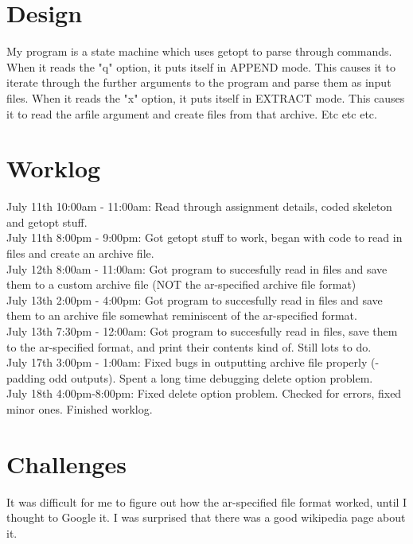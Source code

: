 \documentclass[11pt]{article}
\begin{document}
\section{Design}
My program is a state machine which uses getopt to parse through commands. When it reads the "q" option, it puts itself in APPEND mode. This causes it to iterate through
the further arguments to the program and parse them as input files. When it reads the "x" option, it puts itself in EXTRACT mode. This causes it to read the arfile argument
and create files from that archive. Etc etc etc. \\

\section{Worklog}
July 11th 10:00am - 11:00am: Read through assignment details, coded skeleton and getopt stuff. \\

July 11th 8:00pm - 9:00pm: Got getopt stuff to work, began with code to read in files and create an archive file. \\

July 12th 8:00am - 11:00am: Got program to succesfully read in files and save them to a custom archive file (NOT the ar-specified archive file format) \\

July 13th 2:00pm - 4:00pm: Got program to succesfully read in files and save them to an archive file somewhat reminiscent of the ar-specified format. \\

July 13th 7:30pm - 12:00am: Got program to succesfully read in files, save them to the ar-specified format, and print their contents kind of. Still lots to do. \\

July 17th 3:00pm - 1:00am: Fixed bugs in outputting archive file properly (\n-padding odd outputs). Spent a long time debugging delete option problem. \\

July 18th 4:00pm-8:00pm: Fixed delete option problem. Checked for errors, fixed minor ones. Finished worklog. \\

\section{Challenges}
It was difficult for me to figure out how the ar-specified file format worked, until I thought to Google it. I was surprised that there was a good wikipedia page about it. \\
\end{document}
